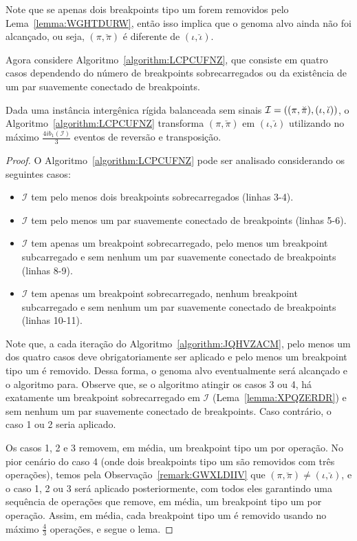 \begin{remark}\label{remark:GWXLDIIV}
Note que se apenas dois breakpoints tipo um forem removidos pelo Lema~\ref{lemma:WGHTDURW}, então isso implica que o genoma alvo ainda não foi alcançado, ou seja, $(\pi,\breve\pi)$ é diferente de $(\iota,\breve\iota)$.
\end{remark}

Agora considere Algoritmo~\ref{algorithm:LCPCUFNZ}, que consiste em quatro casos dependendo do número de breakpoints sobrecarregados ou da existência de um par suavemente conectado de breakpoints.



\begin{lemma}\label{lemma:HIIRAXUH}
Dada uma instância intergênica rígida balanceada sem sinais $\mathcal{I}=((\pi,\breve\pi),\break(\iota,\breve\iota))$, o Algoritmo~\ref{algorithm:LCPCUFNZ} transforma $(\pi,\breve\pi)$ em $(\iota,\breve\iota)$ utilizando no máximo $\frac{4ib_1(\mathcal{I})}{3}$ eventos de reversão e transposição.
\end{lemma}
\begin{proof}
O Algoritmo~\ref{algorithm:LCPCUFNZ} pode ser analisado considerando os seguintes casos:
\begin{itemize}
  \item $\mathcal{I}$ tem pelo menos dois breakpoints sobrecarregados (linhas 3-4).
  \item $\mathcal{I}$ tem pelo menos um par suavemente conectado de breakpoints (linhas 5-6).
  \item $\mathcal{I}$ tem apenas um breakpoint sobrecarregado, pelo menos um breakpoint subcarregado e sem nenhum um par suavemente conectado de breakpoints (linhas 8-9).
  \item $\mathcal{I}$ tem apenas um breakpoint sobrecarregado, nenhum breakpoint subcarregado e sem nenhum um par suavemente conectado de breakpoints (linhas 10-11).
\end{itemize}
Note que, a cada iteração do Algoritmo~\ref{algorithm:JQHVZACM}, pelo menos um dos quatro casos deve obrigatoriamente ser aplicado e pelo menos um breakpoint tipo um é removido. Dessa forma, o genoma alvo eventualmente será alcançado e o algoritmo para. Observe que, se o algoritmo atingir os casos 3 ou 4, há exatamente um breakpoint sobrecarregado em $\mathcal{I}$ (Lema~\ref{lemma:XPQZERDR}) e sem nenhum um par suavemente conectado de breakpoints. Caso contrário, o caso 1 ou 2 seria aplicado.

Os casos 1, 2 e 3 removem, em média, um breakpoint tipo um por operação. No pior cenário do caso 4 (onde dois breakpoints tipo um são removidos com três operações), temos pela Observação~\ref{remark:GWXLDIIV} que $(\pi,\breve\pi) \neq (\iota ,\breve\iota)$, e o caso 1, 2 ou 3 será aplicado posteriormente, com todos eles garantindo uma sequência de operações que remove, em média, um breakpoint tipo um por operação. Assim, em média, cada breakpoint tipo um é removido usando no máximo $\frac{4}{3}$ operações, e segue o lema.
\end{proof}


